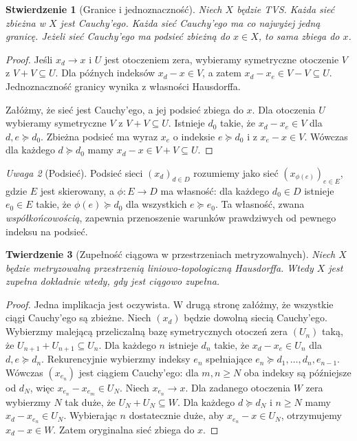 \documentclass[11pt,a4paper]{article}
\numberwithin{equation}{section}
\theoremstyle{plain}
\newtheorem{twierdzenie}{Twierdzenie}[section]
\newtheorem{stwierdzenie}[twierdzenie]{Stwierdzenie}
\theoremstyle{definition}
\theoremstyle{remark}
\newtheorem{uwaga}[twierdzenie]{Uwaga}
\begin{document}
\begin{stwierdzenie}[Granice i jednoznaczność]
\label{prop:complete-basic}
Niech $X$ będzie TVS. Każda sieć zbieżna w $X$ jest Cauchy'ego.
Każda sieć Cauchy'ego ma co najwyżej jedną granicę.
Jeżeli sieć Cauchy'ego ma podsieć zbieżną do $x\in X$, to sama
zbiega do $x$.
\end{stwierdzenie}
\begin{proof}
Jeśli $x_d\to x$ i $U$ jest otoczeniem zera, wybieramy
symetryczne otoczenie $V$ z $V+V\subseteq U$.
Dla późnych indeksów $x_d-x\in V$, a zatem
$x_d-x_e\in V-V\subseteq U$. Jednoznaczność granicy
wynika z własności Hausdorffa.

Załóżmy, że sieć jest Cauchy'ego, a jej podsieć zbiega do $x$.
Dla otoczenia $U$ wybieramy symetryczne $V$ z $V+V\subseteq U$.
Istnieje $d_0$ takie, że $x_d-x_e\in V$ dla $d,e\succeq d_0$.
Zbieżna podsieć ma wyraz $x_{e}$ o indeksie $e\succeq d_0$
i z $x_e-x\in V$. Wówczas dla każdego $d\succeq d_0$
mamy $x_d-x\in V+V\subseteq U$.
\end{proof}

\begin{uwaga}[Podsieć]
Podsieć sieci $(x_d)_{d\in D}$ rozumiemy jako sieć
$(x_{\phi(e)})_{e\in E}$, gdzie $E$ jest skierowany,
a $\phi:E\to D$ ma własność: dla każdego $d_0\in D$
istnieje $e_0\in E$ takie, że $\phi(e)\succeq d_0$
dla wszystkich $e\succeq e_0$. Ta własność, zwana
\emph{współkońcowością}, zapewnia przenoszenie warunków
prawdziwych od pewnego indeksu na podsieć.
\end{uwaga}

\begin{twierdzenie}[Zupełność ciągowa w przestrzeniach metryzowalnych]
\label{thm:metric-complete}
Niech $X$ będzie metryzowalną przestrzenią liniowo-topologiczną
Hausdorffa. Wtedy $X$ jest zupełna dokładnie wtedy,
gdy jest ciągowo zupełna.
\end{twierdzenie}
\begin{proof}
Jedna implikacja jest oczywista. W drugą stronę załóżmy,
że wszystkie ciągi Cauchy'ego są zbieżne. Niech $(x_d)$
będzie dowolną siecią Cauchy'ego. Wybierzmy malejącą
przeliczalną bazę symetrycznych otoczeń zera $(U_n)$
taką, że $U_{n+1}+U_{n+1}\subseteq U_n$.
Dla każdego $n$ istnieje $d_n$ takie, że
$x_d-x_e\in U_n$ dla $d,e\succeq d_n$.
Rekurencyjnie wybierzmy indeksy $e_n$ spełniające
$e_n\succeq d_1,\ldots,d_n,e_{n-1}$.
Wówczas $(x_{e_n})$ jest ciągiem Cauchy'ego: dla
$m,n\geq N$ oba indeksy są późniejsze od $d_N$,
więc $x_{e_n}-x_{e_m}\in U_N$.
Niech $x_{e_n}\to x$. Dla zadanego otoczenia $W$ zera
wybierzmy $N$ tak duże, że $U_N+U_N\subseteq W$.
Dla każdego $d\succeq d_N$ i $n\geq N$ mamy
$x_d-x_{e_n}\in U_N$. Wybierając $n$ dostatecznie duże,
aby $x_{e_n}-x\in U_N$, otrzymujemy $x_d-x\in W$.
Zatem oryginalna sieć zbiega do $x$.
\end{proof}
\end{document}
